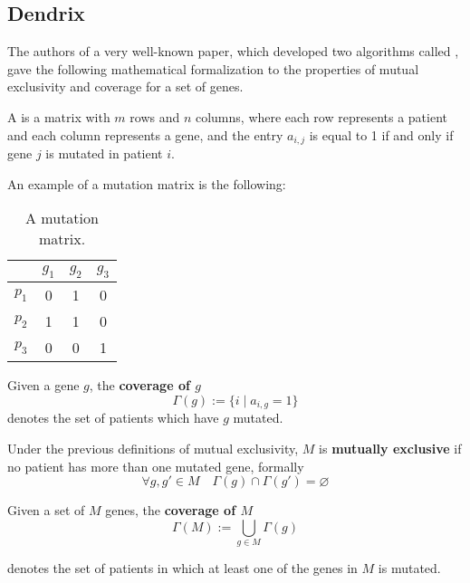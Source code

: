 \subsection{Dendrix}

The authors of a very well-known paper, which developed two algorithms called  \cite{dendrix}, gave the following mathematical formalization to the properties of mutual exclusivity and coverage for a set of genes.

\begin{definition} \label{mut_matrix_def}
    A  is a matrix with $m$ rows and $n$ columns, where each row represents a patient and each column represents a gene, and the entry $a_{i, j}$ is equal to 1 if and only if gene $j$ is mutated in patient $i$.
\end{definition}

\begin{example} \label{mutation_matrix}
    An example of a mutation matrix is the following:

    \begin{table}[H]
        \centering
        \begin{tabular}{c|ccc}
                  & $g_1$ & $g_2$ & $g_3$ \\
            \hline
            $p_1$ & 0 & 1 & 0 \\
            \hline
            $p_2$ & 1 & 1 & 0 \\
            \hline
            $p_3$ & 0 & 0 & 1 \\
        \end{tabular}
        \caption{A mutation matrix.}
    \end{table}
\end{example}

\begin{definition}
    Given a gene $g$, the \textbf{coverage of $g$} $$\Gamma(g) := \{i \mid a_{i, g} = 1\}$$ denotes the set of patients which have $g$ mutated.
\end{definition}

Under the previous definitions of mutual exclusivity, $M$ is \textbf{mutually exclusive} if no patient has more than one mutated gene, formally $$\forall g, g' \in M \quad \Gamma(g) \cap \Gamma(g') = \varnothing$$

\begin{definition}
    Given a set of $M$ genes, the \textbf{coverage of $M$} $$\Gamma(M) := \bigcup_{g \in M}{\Gamma(g)}$$

denotes the set of patients in which at least one of the genes in $M$ is mutated.
\end{definition}

